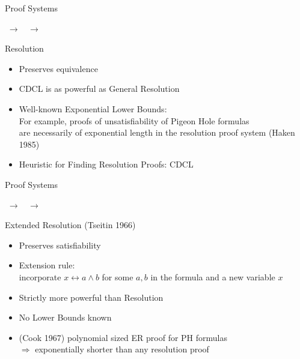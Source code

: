\documentclass[t]{sdqbeamer}
\begin{document}
\begin{frame}{Proof Systems }
\begin{center}\small
{} $\;\rightarrow\;$  $\;\rightarrow\;$ 
\end{center}
\begin{block}{Resolution}
\begin{itemize}\setlength{\itemsep}{1ex}
    \item Preserves equivalence
    \item CDCL is as powerful as General Resolution
    \item Well-known Exponential Lower Bounds:\\[1ex]
    For example, proofs of unsatisfiability of Pigeon Hole formulas\\ 
    are necessarily of exponential length in the resolution proof system (Haken 1985)
    \item Heuristic for Finding Resolution Proofs: CDCL
\end{itemize}
\end{block}
\end{frame}


\begin{frame}{Proof Systems }
\begin{center}\small
{} $\;\rightarrow\;$  $\;\rightarrow\;$ 
\end{center}
\begin{block}{Extended Resolution (Tseitin 1966)}
\begin{itemize}\setlength{\itemsep}{1ex}
    \item Preserves satisfiability
    \item Extension rule:\\
    incorporate $x \leftrightarrow a \land b$ for some $a,b$ in the formula and a new variable $x$
    \item Strictly more powerful than Resolution
    \item No Lower Bounds known
    \item (Cook 1967) polynomial sized ER proof for PH formulas\\[1ex]
    $\Rightarrow$ exponentially shorter than any resolution proof
\end{itemize}
\end{block}
\end{frame}
\end{document}
